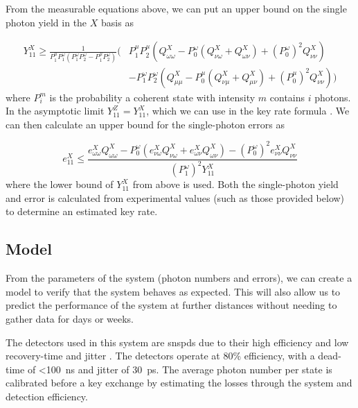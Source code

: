 From the measurable equations above, we can put an upper bound on the single photon yield in the $X$ basis as

\begin{equation}
	\begin{split}
	Y^X_{11} \ge \frac{1}{P^\mu_1 P^\omega_1 ( P^\omega_1  P^\omega_2 - P^\mu_1 P^\omega_2)} \Big(&P^\mu_1 P^\mu_2 (Q_{\omega\omega}^{X} - P^\omega_0 ( Q_{\nu\omega}^X + Q_{\omega\nu}^X) + (P^\omega_0)^2 Q_{\nu\nu}^X) \\
	&- P^\omega_1 P^\omega_2(Q_{\mu\mu}^{X} - P^\mu_0 ( Q_{\nu\mu}^X + Q_{\mu\nu}^X) + (P^\mu_0)^2 Q_{\nu\nu}^X)\Big)
	\end{split}
\end{equation}
where $P_i^m$ is the probability a coherent state with intensity $m$ contains $i$ photons. In the asymptotic limit $Y^Z_{11} =  Y^X_{11}$, which we can use in the key rate formula \cite{Comandar2016}. We can then calculate an upper bound for the single-photon errors as 

\begin{equation}
	e^X_{11} \le \frac{e^X_{\omega\omega}Q^X_{\omega\omega} - P^\omega_0\left(e^X_{\nu\omega}Q^X_{\nu\omega} + e^X_{\omega\nu}Q^X_{\omega\nu}\right) - (P^\omega_0)^2e^X_{\nu\nu}Q^X_{\nu\nu}}{(P^\omega_1)^2 Y^X_{11}}
\end{equation}
where the lower bound of $Y^X_{11}$ from above is used. Both the single-photon yield and error is calculated from experimental values (such as those provided below) to determine an estimated key rate.



\subsection{Model}

From the parameters of the system (photon numbers and errors), we can create a model to verify that the system behaves as expected. This will also allow us to predict the performance of the system at further distances without needing to gather data for days or weeks. 

The detectors used in this system are \acp{snspd} due to their high efficiency and low recovery-time and jitter \cite{sprengers2011}. The detectors operate at $80\%$ efficiency, with a dead-time of \SI{<100}{ns} and jitter of \SI{30}{ps}. The average photon number per state is calibrated before a key exchange by estimating the losses through the system and detection efficiency.

